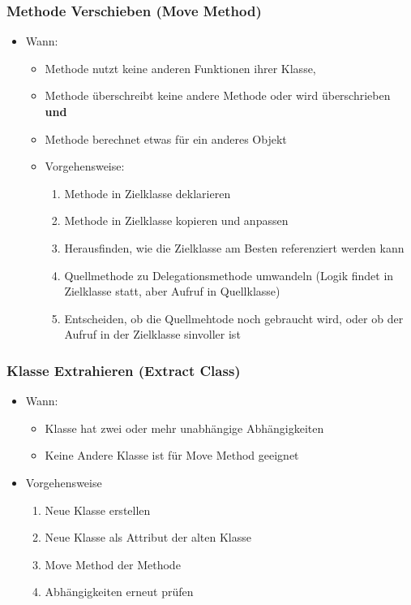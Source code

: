 \documentclass[
    ngerman,
    color=3b,
    summary,
    boxarc,
    main,
]{rubos-tuda-template}
\begin{document}
\subsubsection{Methode Verschieben (Move Method)}
\begin{itemize}
    \item Wann:\begin{itemize}
              \item Methode nutzt keine anderen Funktionen ihrer Klasse,
              \item Methode überschreibt keine andere Methode oder wird überschrieben \textbf{und}
              \item Methode berechnet etwas für ein anderes Objekt
          \end{itemize}
          \begin{itemize}
              \item Vorgehensweise:\begin{enumerate}
                        \item Methode in Zielklasse deklarieren
                        \item Methode in Zielklasse kopieren und anpassen
                        \item Herausfinden, wie die Zielklasse am Besten referenziert werden kann
                        \item Quellmethode zu Delegationsmethode umwandeln (Logik findet in Zielklasse statt, aber Aufruf in Quellklasse)
                        \item Entscheiden, ob die Quellmehtode noch gebraucht wird, oder ob der Aufruf in der Zielklasse sinvoller ist
                    \end{enumerate}
          \end{itemize}
\end{itemize}
\subsubsection{Klasse Extrahieren (Extract Class)}
\begin{itemize}
    \item Wann:\begin{itemize}
              \item Klasse hat zwei oder mehr unabhängige Abhängigkeiten
              \item Keine Andere Klasse ist für Move Method geeignet
          \end{itemize}
    \item Vorgehensweise\begin{enumerate}
              \item Neue Klasse erstellen
              \item Neue Klasse als Attribut der alten Klasse
              \item Move Method der Methode
              \item Abhängigkeiten erneut prüfen
          \end{enumerate}
\end{itemize}
\end{document}
